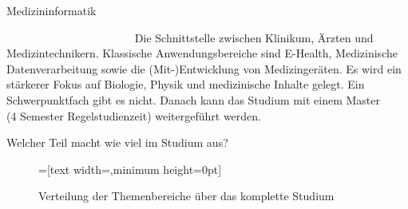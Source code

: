 
\begin{Huge}
    Medizininformatik
\end{Huge}

\begin{exampleblock}{\textcolor{white}{Was ist der Studiengang?}}
    Die Schnittstelle zwischen Klinikum, Ärzten und Medizintechnikern. Klassische Anwendungsbereiche sind E-Health, Medizinische Datenverarbeitung sowie die (Mit-)Entwicklung von Medizingeräten. Es wird ein stärkerer Fokus auf Biologie, Physik und medizinische Inhalte gelegt. Ein Schwerpunktfach gibt es nicht. Danach kann das Studium mit einem Master \\ (4 Semester Regelstudienzeit) weitergeführt werden.
\end{exampleblock}

\begin{block}{Welcher Teil macht wie viel im Studium aus?}
    \begin{figure}[h!]
        \vspace{-20pt}
        \begin{minipage}{\linewidth}
            \centering
            =[text width={},minimum height=0pt]
        \end{minipage}
        \vspace{-20pt}
        \caption{Verteilung der Themenbereiche über das komplette Studium}
    \end{figure}
\end{block}

